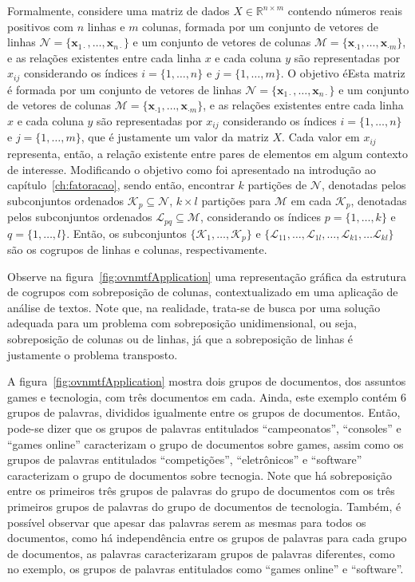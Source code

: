 \documentclass[
    12pt,                %
    oneside,            %
    a4paper,            %
    english,            %
    brazil                %
    ]{abntex2ppgsi}
\begin{document}
Formalmente, considere uma matriz de dados $X \in \mathbb{R}^{n \times m}$ contendo números reais positivos com $n$ linhas e $m$ colunas, formada por um conjunto de vetores de linhas $\mathcal{N} = \{ \mathbf{x}_{1 \cdot}, \dots, \mathbf{x}_{n \cdot} \}$ e um conjunto de vetores de colunas $\mathcal{M} = \{ \mathbf{x}_{\cdot 1}, \dots, \mathbf{x}_{\cdot m} \}$, e as relações existentes entre cada linha $x$ e cada coluna $y$ são representadas por $x_{ij}$ considerando os índices $i = \{1, \dots, n\}$ e $j = \{1, \dots, m\}$.
O objetivo éEsta matriz é formada por um conjunto de vetores de linhas $\mathcal{N} = \{ \mathbf{x}_{1 \cdot}, \dots, \mathbf{x}_{n \cdot} \}$ e um conjunto de vetores de colunas $\mathcal{M} = \{ \mathbf{x}_{\cdot 1}, \dots, \mathbf{x}_{\cdot m} \}$, e as relações existentes entre cada linha $x$ e cada coluna $y$ são representadas por $x_{ij}$ considerando os índices $i = \{1, \dots, n\}$ e $j = \{1, \dots, m\}$, que é justamente um valor da matriz $X$.
Cada valor em $x_{ij}$ representa, então, a relação existente entre pares de elementos em algum contexto de interesse.
Modificando o objetivo como foi apresentado na introdução ao capítulo~\ref{ch:fatoracao}, sendo então, encontrar $k$ partições de $\mathcal{N}$, denotadas pelos subconjuntos ordenados $\mathcal{K}_p \subseteq \mathcal{N}$, $k \times l$ partições para $\mathcal{M}$ em cada $\mathcal{K}_p$, denotadas pelos subconjuntos ordenados $\mathcal{L}_{pq} \subseteq \mathcal{M}$, considerando os índices $p = \{ 1, \dots, k\}$ e $q = \{1, \dots, l\}$.
Então, os subconjuntos $\{\mathcal{K}_1, \dots, \mathcal{K}_p\}$ e $\{\mathcal{L}_{11}, \dots, \mathcal{L}_{1l}, \dots, \mathcal{L}_{k1}, \dots \mathcal{L}_{kl}\}$ são os cogrupos de linhas e colunas, respectivamente.

Observe na figura~\ref{fig:ovnmtfApplication} uma representação gráfica da estrutura de cogrupos com sobreposição de colunas, contextualizado em uma aplicação de análise de textos.
Note que, na realidade, trata-se de busca por uma solução adequada para um problema com sobreposição unidimensional, ou seja, sobreposição de colunas ou de linhas, já que a sobreposição de linhas é justamente o problema transposto.

A figura~\ref{fig:ovnmtfApplication} mostra dois grupos de documentos, dos assuntos games e tecnologia, com três documentos em cada.
Ainda, este exemplo contém $6$ grupos de palavras, divididos igualmente entre os grupos de documentos.
Então, pode-se dizer que os grupos de palavras entitulados ``campeonatos'', ``consoles'' e ``games online'' caracterizam o grupo de documentos sobre games, assim como os grupos de palavras entitulados ``competições'', ``eletrônicos'' e ``software'' caracterizam o grupo de documentos sobre tecnogia.
Note que há sobreposição entre os primeiros três grupos de palavras do grupo de documentos com os três primeiros grupos de palavras do grupo de documentos de tecnologia.
Também, é possível observar que apesar das palavras serem as mesmas para todos os documentos, como há independência entre os grupos de palavras para cada grupo de documentos, as palavras caracterizaram grupos de palavras diferentes, como no exemplo, os grupos de palavras entitulados como ``games online'' e ``software''.
\end{document}
